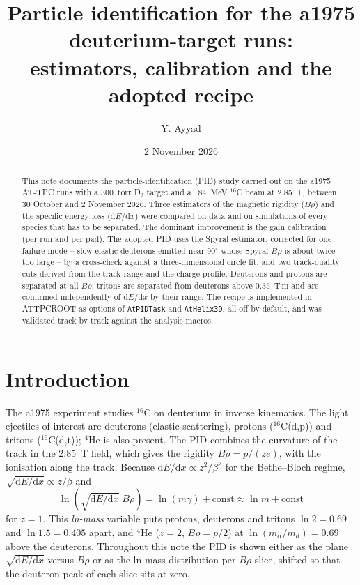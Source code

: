 \documentclass[11pt,a4paper]{article}
\title{Particle identification for the a1975 deuterium-target runs:\\
estimators, calibration and the adopted recipe}
\author{Y. Ayyad}
\date{2 November 2026}
\newcommand{\brho}{$B\rho$}
\newcommand{\dedx}{$\mathrm{d}E/\mathrm{d}x$}
\newcommand{\sqdedx}{$\sqrt{\mathrm{d}E/\mathrm{d}x}$}
\newcommand{\code}[1]{\texttt{#1}}
\begin{document}
\maketitle

\begin{abstract}
This note documents the particle-identification (PID) study carried out on the a1975 AT-TPC runs with a
300~torr D$_2$ target and a 184~MeV $^{16}$C beam at 2.85~T, between 30 October and 2 November 2026. Three
estimators of the magnetic rigidity (\brho) and the specific energy loss (\dedx) were compared on data and on
simulations of every species that has to be separated. The dominant improvement is the gain calibration (per run
and per pad). The adopted PID uses the Spyral estimator, corrected for one failure mode -- slow elastic deuterons
emitted near 90$^\circ$ whose Spyral \brho{} is about twice too large -- by a cross-check against a
three-dimensional circle fit, and two track-quality cuts derived from the track range and the charge profile.
Deuterons and protons are separated at all \brho; tritons are separated from deuterons above 0.35~T\,m and are
confirmed independently of \dedx{} by their range. The recipe is implemented in ATTPCROOT as options of
\code{AtPIDTask} and \code{AtHelix3D}, all off by default, and was validated track by track against the analysis
macros.
\end{abstract}

\tableofcontents

\section{Introduction}

The a1975 experiment studies $^{16}$C on deuterium in inverse kinematics. The light ejectiles of interest are
deuterons (elastic scattering), protons ($^{16}$C(d,p)) and tritons ($^{16}$C(d,t)); $^4$He is also present. The
PID combines the curvature of the track in the 2.85~T field, which gives the rigidity $B\rho = p/(ze)$, with the
ionisation along the track. Because $\mathrm{d}E/\mathrm{d}x \propto z^2/\beta^2$ for the Bethe--Bloch regime,
$\sqrt{\mathrm{d}E/\mathrm{d}x}\propto z/\beta$ and
\begin{equation}
  \ln\!\left(\sqrt{\mathrm{d}E/\mathrm{d}x}\;B\rho\right) = \ln(m\gamma) + \text{const} \approx \ln m + \text{const}
  \label{eq:lnm}
\end{equation}
for $z=1$. This \emph{ln-mass} variable puts protons, deuterons and tritons $\ln 2 = 0.69$ and $\ln 1.5 = 0.405$
apart, and $^4$He ($z=2$, $B\rho = p/2$) at $\ln(m_\alpha/m_d) = 0.69$ above the deuterons. Throughout this note
the PID is shown either as the plane \sqdedx{} versus \brho{} or as the ln-mass distribution per \brho{} slice,
shifted so that the deuteron peak of each slice sits at zero.
\end{document}
